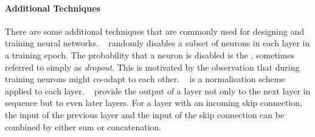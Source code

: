 \documentclass[
	fontsize=10pt, %
	twoside=true, %
	secnumdepth=1, %
  toc=indentunnumbered %
]{kaobook}
\begin{document}








\paragraph{Additional Techniques} There are some additional techniques that are
commonly used for designing and training neural networks.
~\cite{srivastava_dropout_nodate} randomly disables a subset
  of neurons in each layer in a training epoch. The probability that a neuron is
  disabled is the , sometimes referred to simply as
  \textit{dropout}. This is motivated by the observation that during training
  neurons might co-adapt to each other.
~\cite{ioffe_batch_nodate} is a normalisation
  scheme applied to each layer.   
~\cite{he_deep_2015} provide the output of a layer
  not only to the next layer in sequence but to even later layers. For a layer
  with an incoming skip connection, the input of the previous layer and the
  input of the skip connection can be combined by either sum or concatenation.
\end{document}
